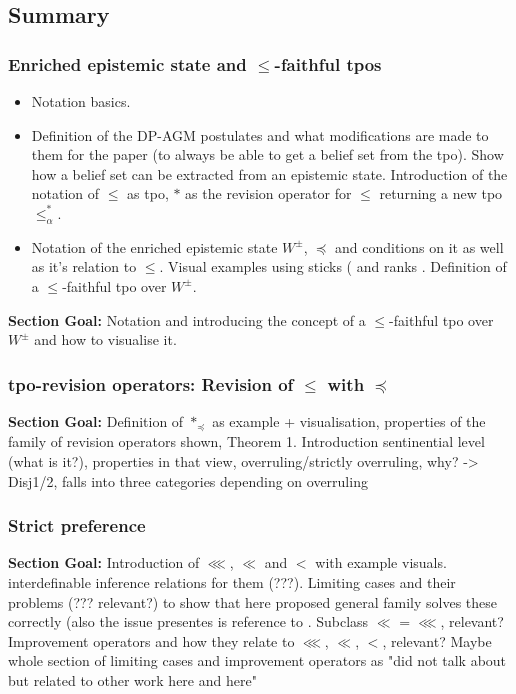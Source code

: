 \documentclass[11pt]{article}
\begin{document}
\subsection{Summary}
\subsubsection{Enriched epistemic state and $\leq$-faithful tpos}
\begin{itemize}
    \item Notation basics.
    \item Definition of the DP-AGM postulates and what modifications are made to them for the paper (to always be able to get a belief set from the tpo). Show how a belief set can be extracted from an epistemic state. Introduction of the notation of $\leq$ as tpo, $\ast$ as the revision operator for $\leq$ returning a new tpo $\leq^{\ast}_{\alpha}$. 
    \item Notation of the enriched epistemic state $W^{\pm}$, $\preceq$ and conditions on it as well as it's relation to $\leq$. Visual examples using sticks (\cite{Booth2011} and ranks \cite{Booth2006}. Definition of a $\leq$-faithful tpo over $W^{\pm}$.
\end{itemize}
\textbf{Section Goal:} Notation and introducing the concept of a $\leq$-faithful tpo over $W^{\pm}$ and how to visualise it.
\subsubsection{tpo-revision operators: Revision of $\leq$ with $\preceq$}
\textbf{Section Goal:} Definition of $\ast_{\preceq}$ as example + visualisation, properties of the family of revision operators shown, Theorem 1. Introduction sentinential level (what is it?), properties in that view, overruling/strictly overruling, why? -> Disj1/2, falls into three categories depending on overruling
\subsubsection{Strict preference}
\textbf{Section Goal:} Introduction of $\lll$, $\ll$ and $<$ with example visuals. interdefinable inference relations for them (???). Limiting cases and their problems (??? relevant?) to show that here proposed general family solves these correctly (also the issue presentes is reference to \cite{Darwiche1997}. Subclass $\ll$ = $\lll$, relevant? Improvement operators and how they relate to $\lll$, $\ll$, $<$, relevant? Maybe whole section of limiting cases and improvement operators as "did not talk about but related to other work here and here"
\end{document}
